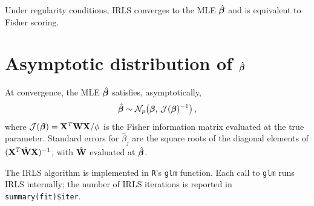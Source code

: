 Under regularity conditions, IRLS converges to the MLE
$\hat{\boldsymbol{\beta}}$ and is equivalent to Fisher scoring.

\section*{Asymptotic distribution of $\hat{\boldsymbol{\beta}}$}

At convergence, the MLE $\hat{\boldsymbol{\beta}}$ satisfies, asymptotically,
\[
  \hat{\boldsymbol{\beta}} \sim \mathcal{N}_p\!\left(\boldsymbol{\beta},\,\mathcal{J}(\boldsymbol{\beta})^{-1}\right),
\]
where $\mathcal{J}(\boldsymbol{\beta}) = \mathbf{X}^T\mathbf{W}\mathbf{X}/\phi$ is the Fisher information
matrix evaluated at the true parameter.  Standard errors for
$\hat\beta_j$ are the square roots of the diagonal elements of
$(\mathbf{X}^T\hat{\mathbf{W}}\mathbf{X})^{-1}$, with $\hat{\mathbf{W}}$ evaluated at $\hat{\boldsymbol{\beta}}$.

\begin{remark}
  The IRLS algorithm is implemented in \texttt{R}'s \texttt{glm}
  function.  Each call to \texttt{glm} runs IRLS internally; the number
  of IRLS iterations is reported in \texttt{summary(fit)\$iter}.
\end{remark}


